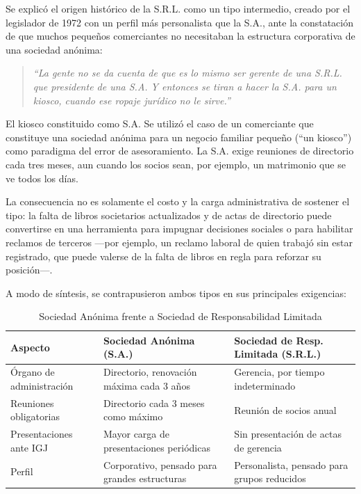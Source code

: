 \documentclass[12pt,oneside]{book}
\begin{document}
Se explicó el origen histórico de la S.R.L. como un tipo intermedio, creado por el legislador de 1972 con un perfil más personalista que la S.A., ante la constatación de que muchos pequeños comerciantes no necesitaban la estructura corporativa de una sociedad anónima:

\begin{quote}
\textit{``La gente no se da cuenta de que es lo mismo ser gerente de una S.R.L. que presidente de una S.A. Y entonces se tiran a hacer la S.A. para un kiosco, cuando ese ropaje jurídico no le sirve.''}
\end{quote}

\begin{example}{El kiosco constituido como S.A.}
Se utilizó el caso de un comerciante que constituye una sociedad anónima para un negocio familiar pequeño (``un kiosco'') como paradigma del error de asesoramiento. La S.A. exige reuniones de directorio cada tres meses, aun cuando los socios sean, por ejemplo, un matrimonio que se ve todos los días.

La consecuencia no es solamente el costo y la carga administrativa de sostener el tipo: la falta de libros societarios actualizados y de actas de directorio puede convertirse en una herramienta para impugnar decisiones sociales o para habilitar reclamos de terceros —por ejemplo, un reclamo laboral de quien trabajó sin estar registrado, que puede valerse de la falta de libros en regla para reforzar su posición—.
\end{example}

A modo de síntesis, se contrapusieron ambos tipos en sus principales exigencias:

\begin{table}[H]
\centering
\caption{Sociedad Anónima frente a Sociedad de Responsabilidad Limitada}
\begin{tabularx}{\textwidth}{>{\raggedright\arraybackslash}p{}XX}
\toprule
\textbf{Aspecto} & \textbf{Sociedad Anónima (S.A.)} & \textbf{Sociedad de Resp. Limitada (S.R.L.)} \\
\midrule
Órgano de administración & Directorio, renovación máxima cada 3 años & Gerencia, por tiempo indeterminado \\
Reuniones obligatorias & Directorio cada 3 meses como máximo & Reunión de socios anual \\
Presentaciones ante IGJ & Mayor carga de presentaciones periódicas & Sin presentación de actas de gerencia \\
Perfil & Corporativo, pensado para grandes estructuras & Personalista, pensado para grupos reducidos \\
\bottomrule
\end{tabularx}
\end{table}
\end{document}
